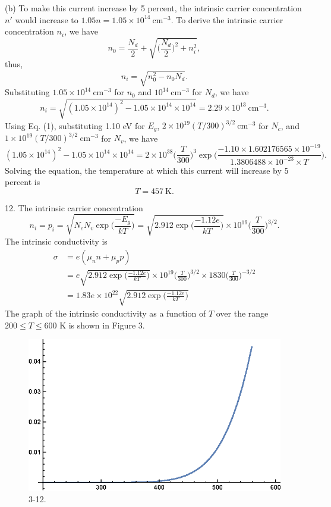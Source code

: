 \documentclass[a4paper]{article}
\begin{document}
(b) To make this current increase by 5 percent, the intrinsic carrier concentration $n'$ would increase to $1.05n=1.05\times10^{14}\ \text{cm}^{-3}$. To derive the intrinsic carrier concentration $n_i$, we have
$$n_0=\frac{N_d}{2}+\sqrt{\Big(\frac{N_d}{2}\Big)^2+n_i^2},$$
thus,
$$n_i=\sqrt{n_0^2-n_0N_d}.$$
Substituting $1.05\times10^{14}\ \text{cm}^{-3}$ for $n_0$ and $10^{14}\ \text{cm}^{-3}$ for $N_d$, we have
$$n_i=\sqrt{(1.05\times10^{14})^2-1.05\times10^{14}\times10^{14}}=2.29\times10^{13}\ \text{cm}^{-3}.$$
Using Eq. (1), substituting 1.10 eV for $E_g$, $2\times10^{19}(T/300)^{3/2}\ \text{cm}^{-3}$ for $N_c$, and $1\times10^{19}(T/300)^{3/2}\ \text{cm}^{-3}$ for $N_v$, we have
$$(1.05\times10^{14})^2-1.05\times10^{14}\times10^{14}=2\times10^{38}\Big(\frac{T}{300}\Big)^3\exp{\Big(\frac{-1.10\times1.602176565\times10^{-19}}{1.3806488\times10^{-23}\times T}\Big)}.$$
Solving the equation, the temperature at which this current will increase by 5 percent is
$$T=457\ \text{K}.$$

12. The intrinsic carrier concentration
$$n_i=p_i=\sqrt{N_cN_v\exp{\Big(\frac{-E_g}{kT}\Big)}}=\sqrt{2.912\exp{\Big(\frac{-1.12e}{kT}\Big)}}\times10^{19}\Big(\frac{T}{300}\Big)^{3/2}.$$
The intrinsic conductivity is
\[
    \begin{aligned}
        \sigma&=e(\mu_nn+\mu_pp)\\
        &=e\sqrt{2.912\exp{\Big(\frac{-1.12e}{kT}\Big)}}\times10^{19}\Big(\frac{T}{300}\Big)^{3/2}\times1830\Big(\frac{T}{300}\Big)^{-3/2}\\
        &=1.83e\times10^{22}\sqrt{2.912\exp{\Big(\frac{-1.12e}{kT}\Big)}}
    \end{aligned}
\]
The graph of the intrinsic conductivity as a function of $T$ over the range $200\leq T\leq600$ K is shown in Figure 3.
\begin{figure}[H]
    \centering
    \includegraphics[width=1\textwidth]{3-12.eps}
    \caption{3-12.}
\end{figure}
\end{document}
